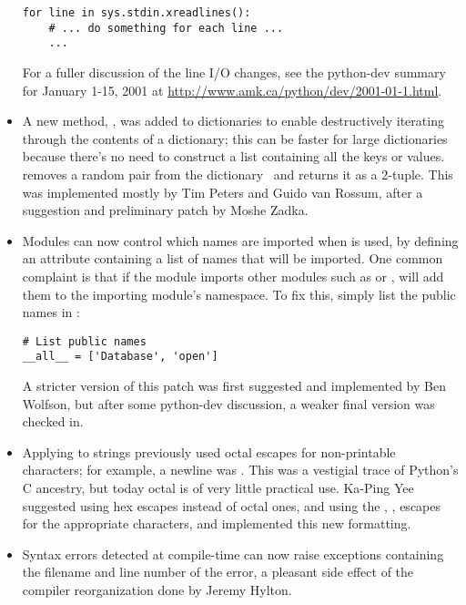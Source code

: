 \documentclass{howto}
\begin{document}
\begin{itemize}
\begin{verbatim}
for line in sys.stdin.xreadlines():
    # ... do something for each line ...
    ...
\end{verbatim}

For a fuller discussion of the line I/O changes, see the python-dev
summary for January 1-15, 2001 at
\url{http://www.amk.ca/python/dev/2001-01-1.html}.

\item A new method, , was added to dictionaries to
enable destructively iterating through the contents of a dictionary;
this can be faster for large dictionaries because there's no need to
construct a list containing all the keys or values.
 removes a random 
pair from the dictionary~ and returns it as a 2-tuple.  This
was implemented mostly by Tim Peters and Guido van Rossum, after a
suggestion and preliminary patch by Moshe Zadka.
 
\item Modules can now control which names are imported when  is used, by defining an 
attribute containing a list of names that will be imported.  One
common complaint is that if the module imports other modules such as
 or , 
will add them to the importing module's namespace.  To fix this,
simply list the public names in :

\begin{verbatim}
# List public names
__all__ = ['Database', 'open']
\end{verbatim}

A stricter version of this patch was first suggested and implemented
by Ben Wolfson, but after some python-dev discussion, a weaker final
version was checked in.

\item Applying  to strings previously used octal
escapes for non-printable characters; for example, a newline was
.  This was a vestigial trace of Python's C ancestry, but
today octal is of very little practical use.  Ka-Ping Yee suggested
using hex escapes instead of octal ones, and using the ,
,  escapes for the appropriate characters, and
implemented this new formatting.

\item Syntax errors detected at compile-time can now raise exceptions
containing the filename and line number of the error, a pleasant side
effect of the compiler reorganization done by Jeremy Hylton.


\end{itemize}
\end{document}
